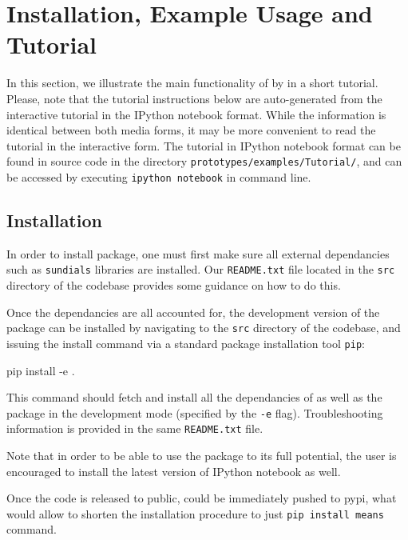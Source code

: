 \section{Installation, Example Usage and Tutorial} \label{examples}
In this section, we illustrate the main functionality of \means{} by in a short tutorial.
Please, note that the tutorial instructions below are auto-generated from the interactive tutorial in the IPython notebook format. 
While the information is identical between both media forms, it may be more convenient to read the tutorial in the interactive form. 
The tutorial in  IPython notebook format can be found in \means{} source code in the directory  \verb"prototypes/examples/Tutorial/", and can be accessed by executing \texttt{ipython notebook} in command line.

\subsection{Installation}

In order to install \means{} package, one must first make sure all external dependancies such as \verb"sundials" libraries \cite{hindmarsh_sundials_2005} are installed. 
Our \verb"README.txt" file located in the \verb"src" directory of the codebase provides some guidance on how to do this.

Once the dependancies are all accounted for, the development version of the \means{} package can be installed by navigating to the \verb"src" directory of the codebase, and issuing the install command via a standard \py{} package installation tool \verb"pip":

\begin{InputVerbatim}
pip install -e .
\end{InputVerbatim}

This command should fetch and install all the dependancies of \means{} as well as the package in the development mode (specified by the \verb"-e" flag). 
Troubleshooting information is provided in the same \verb"README.txt" file.

Note that in order to be able to use the \means{} package to its full potential, the user is encouraged to install the latest version of  IPython notebook\cite{perez_ipython:_2007} as well.

Once the code is released to public, \means{} could be immediately pushed to \gls{pypi}, what would allow to shorten the installation procedure to just \verb"pip install means" command.

